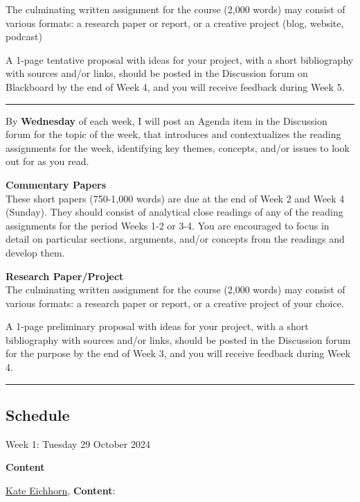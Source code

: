 \documentclass[
  letterpaper,
  DIV=11,
  numbers=noendperiod,
  oneside]{scrartcl}
\begin{document}
The culminating written assignment for the course (2,000 words) may
consist of various formats: a research paper or report, or a creative
project (blog, website, podcast)

A 1-page tentative proposal with ideas for your project, with a short
bibliography with sources and/or links, should be posted in the
Discussion forum on Blackboard by the end of Week 4, and you will
receive feedback during Week 5.

\begin{center}\rule{0.5\linewidth}{0.5pt}\end{center}

By \textbf{Wednesday} of each week, I will post an Agenda item in the
Discussion forum for the topic of the week, that introduces and
contextualizes the reading assignments for the week, identifying key
themes, concepts, and/or issues to look out for as you read.

\textbf{Commentary Papers}\\
These short papers (750-1,000 words) are due at the end of Week 2 and
Week 4 (Sunday). They should consist of analytical close readings of any
of the reading assignments for the period Weeks 1-2 or 3-4. You are
encouraged to focus in detail on particular sections, arguments, and/or
concepts from the readings and develop them.

\textbf{Research Paper/Project}\\
The culminating written assignment for the course (2,000 words) may
consist of various formats: a research paper or report, or a creative
project of your choice.

A 1-page preliminary proposal with ideas for your project, with a short
bibliography with sources and/or links, should be posted in the
Discussion forum for the purpose by the end of Week 3, and you will
receive feedback during Week 4.

\begin{center}\rule{0.5\linewidth}{0.5pt}\end{center}

\subsection{Schedule}\label{schedule}

Week 1: Tuesday 29 October 2024

\textbf{Content}

\href{https://emerson.edu/faculty-staff-directory/kate-eichhorn}{Kate
Eichhorn}, \textbf{Content}:
\end{document}
